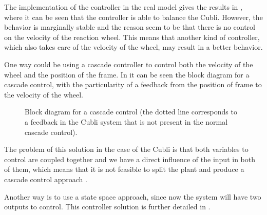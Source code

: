 The implementation of the controller in the real model gives the results in , where it can be seen that the controller is able to balance the Cubli. However, the behavior is marginally stable and the reason seem to be that there is no control on the velocity of the reaction wheel. This means that another kind of controller, which also takes care of the velocity of the wheel, may result in a better behavior.
%


One way could be using a cascade controller to control both the velocity of the wheel and the position of the frame. In  it can be seen the block diagram for a cascade control, with the particularity of a feedback from the position of frame to the velocity of the wheel.
%
\begin{figure}[H]
	
	\centering
	\caption{Block diagram for a cascade control (the dotted line corresponds to a feedback in the Cubli system that is not present in the normal cascade control).}
	\label{cascadeControl}
\end{figure}\vspace{-18pt}
%
The problem of this solution in the case of the Cubli is that both variables to control are coupled together and we have a direct influence of the input in both of them, which means that it is not feasible to split the plant and produce a cascade control approach .\cite{LRusso}

Another way is to use a state space approach, since now the system will have two outputs to control. This controller solution is further detailed in .
